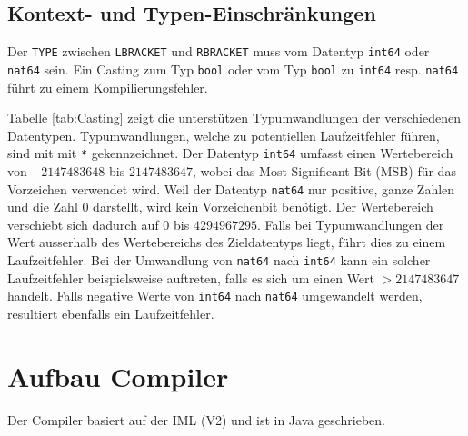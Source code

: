 \documentclass[10pt, a4paper, twocolumn]{article} %
\begin{document}
\subsection{Kontext- und Typen-Einschränkungen}
Der \texttt{TYPE} zwischen \texttt{LBRACKET} und \texttt{RBRACKET} muss vom Datentyp \texttt{int64} oder \texttt{nat64} sein.
Ein Casting zum Typ \texttt{bool} oder vom Typ \texttt{bool} zu \texttt{int64} resp. \texttt{nat64} führt zu einem Kompilierungsfehler.

Tabelle \ref{tab:Casting} zeigt die unterstützen Typumwandlungen der verschiedenen Datentypen.
Typumwandlungen, welche zu potentiellen Laufzeitfehler führen, sind mit mit \texttt{*} gekennzeichnet.
Der Datentyp \texttt{int64} umfasst einen Wertebereich von $-2147483648$ bis $2147483647$, wobei das Most Significant Bit (MSB) für das Vorzeichen verwendet wird.
Weil der Datentyp \texttt{nat64} nur positive, ganze Zahlen und die Zahl 0 darstellt, wird kein Vorzeichenbit benötigt.
Der Wertebereich verschiebt sich dadurch auf $0$ bis $4294967295$.
Falls bei Typumwandlungen der Wert ausserhalb des Wertebereichs des Zieldatentyps liegt, führt dies zu einem Laufzeitfehler.
Bei der Umwandlung von \texttt{nat64} nach \texttt{int64} kann ein solcher Laufzeitfehler beispielsweise auftreten, falls es sich um einen Wert $> 2147483647$ handelt.
Falls negative Werte von \texttt{int64} nach \texttt{nat64} umgewandelt werden, resultiert ebenfalls ein Laufzeitfehler.
\begin{table}[h]
    \tiny
    \centering
    \caption{Casting zwischen Datentypen}
    \label{tab:Casting}
\end{table}

\section{Aufbau Compiler}
Der Compiler basiert auf der IML (V2) und ist in Java geschrieben.
\end{document}
